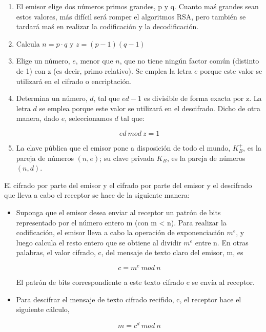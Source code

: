 \documentclass[a4paper,11pt]{article}
\begin{document}
\begin{enumerate}
\item El emisor elige dos números primos grandes, p y q. Cuanto maś grandes sean estos valores, más difícil será romper el algoritmos RSA, pero también se tardará maś en realizar la codificación y la decodificación. 

\item Calcula $n=p\cdot q$ y $z=(p-1)(q-1)$

\item Elige un número, $e$, menor que $n$, que no tiene ningún factor común (distinto de 1) con z (es decir, primo relativo). Se emplea la letra $e$ porque este valor se utilizará en el cifrado o encriptación.

\item Determina un número, $d$, tal que $ed-1$ es divisible de forma exacta por z. La letra $d$ se emplea porque este valor se utilizará en el descifrado. Dicho de otra manera, dado $e$, seleccionamos $d$ tal que:

\begin{equation*}
ed \> mod \> z=1
\end{equation*}

\item La clave pública que el emisor pone a disposición de todo el mundo, $K_B^+$, es la pareja de números $(n,e)$; su clave privada $K_B^-$, es la pareja de números $(n,d)$.
\end{enumerate}

El cifrado por parte del emisor y el cifrado por parte del emisor y el descifrado que lleva a cabo el receptor se hace de la siguiente manera: 

\begin{itemize}
\item Suponga que el emisor desea enviar al receptor un patrón de bits representado por el número entero m (con m < n). Para realizar la codificación, el emisor lleva a cabo la operación de exponenciación $m^e$, y luego calcula el resto entero que se obtiene al dividir $m^e$ entre n. En otras palabras, el valor cifrado, c, del mensaje de texto claro del emisor, m, es

\begin{equation*}
c = m^e \> mod \> n
\end{equation*}

El patrón de bits correspondiente a este texto cifrado c se envía al receptor.

\item Para descifrar el mensaje de texto cifrado recifido, c, el receptor hace el siguiente cálculo,

\begin{equation*}
m = c^d \> mod \> n
\end{equation*}
\end{itemize}
\end{document}
